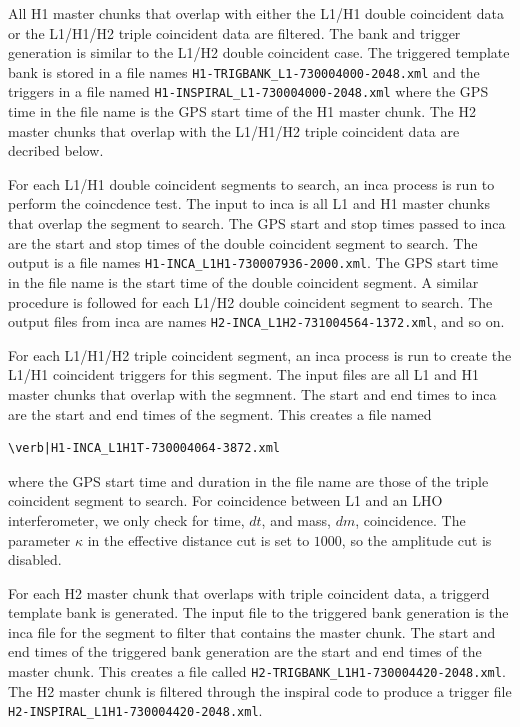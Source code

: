 All H1 master chunks that overlap with either the L1/H1 double coincident data
or the L1/H1/H2 triple coincident data are filtered. The bank and trigger
generation is similar to the L1/H2 double coincident case. The triggered
template bank is stored in a file names
\verb|H1-TRIGBANK_L1-730004000-2048.xml| and the triggers in a file named
\verb|H1-INSPIRAL_L1-730004000-2048.xml| where the GPS time in the file name
is the GPS start time of the H1 master chunk. The H2 master chunks that
overlap with the L1/H1/H2 triple coincident data are decribed below.

For each L1/H1 double coincident segments to search, an inca process is run to
perform the coincdence test. The input to inca is all L1 and H1 master chunks
that overlap the segment to search. The GPS start and stop times passed to
inca are the start and stop times of the double coincident segment to search.
The output is a file names \verb|H1-INCA_L1H1-730007936-2000.xml|. The GPS
start time in the file name is the start time of the double coincident
segment.  A similar procedure is followed for each L1/H2 double coincident
segment to search. The output files from inca are names
\verb|H2-INCA_L1H2-731004564-1372.xml|, and so on.

For each L1/H1/H2 triple coincident segment, an inca process is run to create
the L1/H1 coincident triggers for this segment. The input files are all L1 and
H1 master chunks that overlap with the segmnent. The start and end times to
inca are the start and end times of the segment. This creates a file named
\begin{verbatim}
\verb|H1-INCA_L1H1T-730004064-3872.xml
\end{verbatim}
where the GPS start time and duration in the file name are those of the triple
coincident segment to search.  For coincidence between L1 and an LHO
interferometer, we only check for time, $dt$, and mass, $dm$, coincidence.
The parameter $\kappa$ in the effective distance cut is set to $1000$, so the
amplitude cut is disabled.

For each H2 master chunk that overlaps with triple coincident data, a triggerd
template bank is generated. The input file to the triggered bank generation is
the inca file for the segment to filter that contains the master chunk. The
start and end times of the triggered bank generation are the start and end
times of the master chunk. This creates a file called
\verb|H2-TRIGBANK_L1H1-730004420-2048.xml|.  The H2 master chunk is filtered
through the inspiral code to produce a trigger file
\verb|H2-INSPIRAL_L1H1-730004420-2048.xml|.
 
